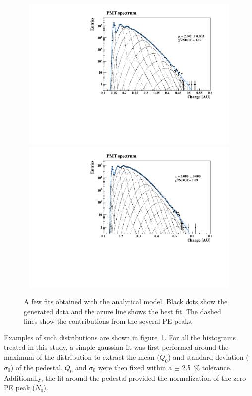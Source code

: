 \documentclass[preprint,12pt]{elsarticle}
\begin{document}
\begin{figure}[!t]
\centering
\includegraphics[width=11.5cm, height=7.5cm]{figures/mc-fit-2.pdf} \\
\includegraphics[width=11.5cm, height=7.5cm]{figures/mc-fit-3.pdf} \\
\caption{ A few fits obtained with the analytical model. 
Black dots show the generated data and the azure line shows the best fit. The dashed lines show the contributions from the several PE peaks. }
\label{fig:spes}
\end{figure}
Examples of such distributions are shown in figure~\ref{fig:spes}. 
For all the histograms treated in this study, a simple gaussian fit was first performed around the maximum of the distribution to extract the mean ($Q_0$) and standard deviation ($\sigma_0$) of the pedestal. 
$Q_0$ and $\sigma_0$ were then fixed within a $\pm$ 2.5~\% tolerance. 
Additionally, the fit around the pedestal provided the normalization of the zero PE peak ($N_0$). 
\end{document}
